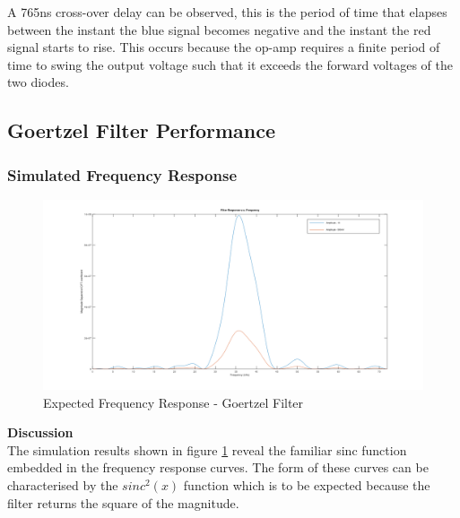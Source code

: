 A 765ns cross-over delay can be observed, this is the period of time that elapses between the instant the blue signal becomes negative and the instant the red signal starts to rise. This occurs because the op-amp requires a finite period of time to swing the output voltage such that it exceeds the forward voltages of the two diodes.








\subsection{Goertzel Filter Performance}

\subsubsection{Simulated Frequency Response}


\begin{figure}[H]
	\centering
	\includegraphics[width=\linewidth]{figures/results/goertzel_filter_simulation_wide.png}
	\caption{Expected Frequency Response - Goertzel Filter}
	\label{fig:goertzel_filter_response_simulated}
\end{figure}



\textbf{Discussion}\\
The simulation results shown in figure \ref{fig:goertzel_filter_response_simulated} reveal the familiar sinc function embedded in the frequency response curves. The form of these curves can be characterised by the $sinc^2(x)$ function which is to be expected because the filter returns the square of the magnitude.

